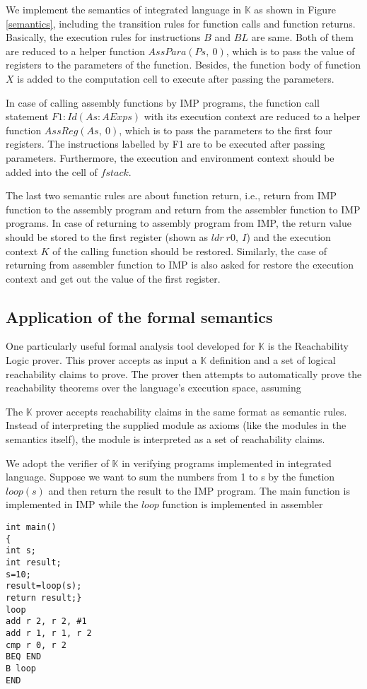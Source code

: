 \documentclass[conference]{IEEEtran}
\begin{document}
\par We implement the semantics of integrated language in $\mathbb{K}$ as shown in Figure \ref{semantics}, including the transition rules for function calls and function returns. Basically, the execution rules for instructions $B$ and $BL$ are same. Both of them are reduced to a helper function $AssPara(Ps,~0)$, which is to pass the value of registers to the parameters of the function. Besides, the function body of function $X$ is added to the computation cell to execute after passing the parameters.
\par In case of calling assembly functions by IMP programs, the function call statement $F1:Id(As:AExps)$ with its execution context are reduced to a helper function $AssReg(As,~0)$, which is to pass the parameters to the first four registers. The instructions labelled by F1 are to be executed after  passing parameters. Furthermore, the execution and environment context should be added into the cell of $fstack$.
\par The last two semantic rules are about function return, i.e., return from IMP function to the assembly program and return from the assembler function to IMP programs. In case of returning to assembly program from IMP, the return value should be stored to the first register (shown as $ldr~r0,~I$) and the execution context $K$ of the calling function should be restored. Similarly, the case of returning from assembler function to IMP is also asked for restore the execution context and get out the value of the first register.
\subsection{Application of the formal semantics}
\par One particularly useful formal analysis tool developed for $\mathbb{K}$ is the Reachability Logic prover. This prover
accepts as input a $\mathbb{K}$ definition and a set of logical reachability claims to prove. The prover then attempts
to automatically prove the reachability theorems over the language's execution space, assuming
\par The $\mathbb{K}$ prover accepts reachability claims in the same format as semantic rules.
Instead of interpreting the supplied module as axioms (like the modules in the semantics itself), the module is interpreted as a set of reachability claims.
\par We adopt the verifier of $\mathbb{K}$ in verifying programs implemented in integrated language. Suppose we want to sum the numbers from 1 to s by the function $loop(s)$ and then return the result to the IMP program. The main function is implemented in IMP while the $loop$ function is implemented in assembler
\begin{lstlisting}
int main()
{
int s;
int result;
s=10;
result=loop(s);
return result;}
loop
add r 2, r 2, #1
add r 1, r 1, r 2
cmp r 0, r 2
BEQ END
B loop
END
\end{lstlisting}
\end{document}
